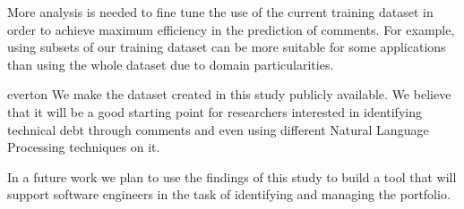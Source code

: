 More analysis is needed to fine tune the use of the current training dataset in order to achieve maximum efficiency in the prediction of \SATD comments. For example, using subsets of our training dataset can be more suitable for some applications than using the whole dataset due to domain particularities. 

everton {We make the dataset created in this study publicly available. We believe that it will be a good starting point for researchers interested in identifying technical debt through comments and even using different Natural Language Processing techniques on it.}  

In a future work we plan to use the findings of this study to build a tool that will support software engineers in the task of identifying and managing the \SATD portfolio. 

